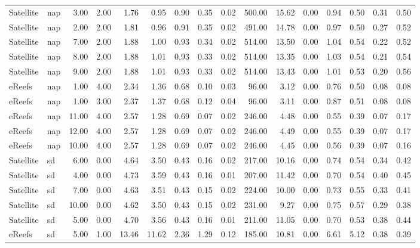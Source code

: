\begin{table}[ht]
\begin{tabular}{llrrrrrrrrrrrrrr}
   \midrule
Satellite & nap & 3.00 & 2.00 & 1.76 & 0.95 & 0.90 & 0.35 & 0.02 & 500.00 & 15.62 & 0.00 & 0.94 & 0.50 & 0.31 & 0.50 \\ 
  Satellite & nap & 2.00 & 2.00 & 1.81 & 0.96 & 0.91 & 0.35 & 0.02 & 491.00 & 14.78 & 0.00 & 0.97 & 0.50 & 0.27 & 0.52 \\ 
  Satellite & nap & 7.00 & 2.00 & 1.88 & 1.00 & 0.93 & 0.34 & 0.02 & 514.00 & 13.50 & 0.00 & 1.04 & 0.54 & 0.22 & 0.52 \\ 
  Satellite & nap & 8.00 & 2.00 & 1.88 & 1.01 & 0.93 & 0.33 & 0.02 & 514.00 & 13.35 & 0.00 & 1.03 & 0.54 & 0.21 & 0.54 \\ 
  Satellite & nap & 9.00 & 2.00 & 1.88 & 1.01 & 0.93 & 0.33 & 0.02 & 514.00 & 13.43 & 0.00 & 1.01 & 0.53 & 0.20 & 0.56 \\ 
  eReefs & nap & 1.00 & 4.00 & 2.34 & 1.36 & 0.68 & 0.10 & 0.03 & 96.00 & 3.12 & 0.00 & 0.76 & 0.50 & 0.08 & 0.08 \\ 
  eReefs & nap & 1.00 & 3.00 & 2.37 & 1.37 & 0.68 & 0.12 & 0.04 & 96.00 & 3.11 & 0.00 & 0.87 & 0.51 & 0.08 & 0.08 \\ 
  eReefs & nap & 11.00 & 4.00 & 2.57 & 1.28 & 0.69 & 0.07 & 0.02 & 246.00 & 4.48 & 0.00 & 0.55 & 0.39 & 0.07 & 0.17 \\ 
  eReefs & nap & 12.00 & 4.00 & 2.57 & 1.28 & 0.69 & 0.07 & 0.02 & 246.00 & 4.49 & 0.00 & 0.55 & 0.39 & 0.07 & 0.17 \\ 
  eReefs & nap & 10.00 & 4.00 & 2.57 & 1.28 & 0.69 & 0.07 & 0.02 & 246.00 & 4.45 & 0.00 & 0.56 & 0.39 & 0.07 & 0.16 \\ 
   \midrule
Satellite & sd & 6.00 & 0.00 & 4.64 & 3.50 & 0.43 & 0.16 & 0.02 & 217.00 & 10.16 & 0.00 & 0.74 & 0.54 & 0.34 & 0.42 \\ 
  Satellite & sd & 4.00 & 0.00 & 4.73 & 3.59 & 0.43 & 0.16 & 0.01 & 207.00 & 11.42 & 0.00 & 0.70 & 0.54 & 0.40 & 0.45 \\ 
  Satellite & sd & 7.00 & 0.00 & 4.63 & 3.51 & 0.43 & 0.15 & 0.02 & 224.00 & 10.00 & 0.00 & 0.73 & 0.55 & 0.33 & 0.41 \\ 
  Satellite & sd & 10.00 & 0.00 & 4.62 & 3.50 & 0.43 & 0.15 & 0.02 & 231.00 & 9.27 & 0.00 & 0.75 & 0.57 & 0.29 & 0.38 \\ 
  Satellite & sd & 5.00 & 0.00 & 4.70 & 3.56 & 0.43 & 0.16 & 0.01 & 211.00 & 11.05 & 0.00 & 0.70 & 0.53 & 0.38 & 0.44 \\ 
  eReefs & sd & 5.00 & 1.00 & 13.46 & 11.62 & 2.36 & 1.29 & 0.12 & 185.00 & 10.81 & 0.00 & 6.61 & 5.12 & 0.38 & 0.39 \\ 

\end{tabular}
\end{table}

